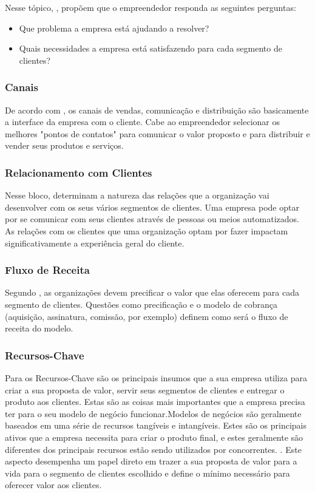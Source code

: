Nesse tópico, , propõem que o empreendedor responda as seguintes perguntas:
\begin{itemize}
\item Que problema a empresa está ajudando a resolver?
\item Quais necessidades a empresa está satisfazendo para cada segmento de clientes?
\end{itemize}

\subsubsection{Canais}
\label{cha:canais}
De acordo com , os canais de vendas, comunicação e distribuição são basicamente a interface da empresa com o cliente. Cabe ao empreendedor selecionar os melhores "pontos de contatos" para comunicar o valor proposto e para distribuir e vender seus produtos e serviços.

\subsubsection{Relacionamento com Clientes}
\label{cha:relacionamentos_com_clientes}
Nesse bloco,  determinam a natureza das relações que a organização vai desenvolver com os seus vários segmentos de clientes. Uma empresa pode optar por se comunicar com seus clientes através de pessoas ou meios automatizados. As relações com os clientes que uma organização optam por fazer impactam significativamente a experiência geral do cliente.

\subsubsection{Fluxo de Receita}
\label{cha:fluxo_de_receita}
Segundo , as organizações devem precificar o valor que elas oferecem para cada segmento de clientes. Questões como precificação e o modelo de cobrança (aquisição, assinatura, comissão, por exemplo) definem como será o fluxo de receita do modelo.

\subsubsection{Recursos-Chave}
\label{cha:recursos_chave}
Para  os Recursos-Chave são os principais insumos que a sua empresa utiliza para criar a sua proposta de valor, servir seus segmentos de clientes e entregar o produto aos clientes. Estas são as coisas mais importantes que a empresa precisa ter para o seu modelo de negócio funcionar.Modelos de negócios são geralmente baseados em uma série de recursos tangíveis e intangíveis. Estes são os principais ativos que a empresa necessita para criar o produto final, e estes geralmente são diferentes dos principais recursos estão sendo utilizados por concorrentes. . Este aspecto desempenha um papel direto em trazer a sua proposta de valor para a vida para o segmento de clientes escolhido e define o mínimo necessário para oferecer valor aos clientes.

